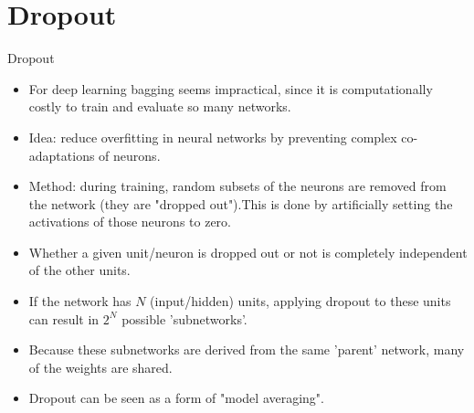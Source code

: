 \section{Dropout}

\begin{vbframe}{Dropout}
  \begin{itemize}
\item For deep learning bagging seems impractical, since it is
computationally costly to train and evaluate so many networks.
    \item %
    Idea: reduce overfitting in neural networks by preventing complex co-adaptations of neurons.
    \item Method: during training, random subsets of the neurons are removed from the network (they are "dropped out").This is done by artificially setting the activations of those neurons to zero.
    \item Whether a given unit/neuron is dropped out or not is completely independent of the other units.
    \item If the network has $N$ (input/hidden) units, applying dropout to these units can result in $2^N$ possible 'subnetworks'.
    \item Because these subnetworks are derived from the same 'parent' network, many of the weights are shared.
    \item Dropout can be seen as a form of "model averaging".
  \end{itemize}
\framebreak
  \begin{figure}
    \centering

\end{figure}
\end{vbframe}
